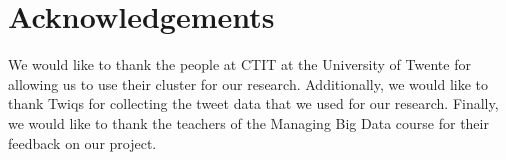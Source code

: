 \section{Acknowledgements}
We would like to thank the people at CTIT at the University of Twente for allowing us to use their cluster for our research. Additionally, we would like to thank Twiqs for collecting the tweet data that we used for our research. Finally, we would like to thank the teachers of the Managing Big Data course for their feedback on our project.